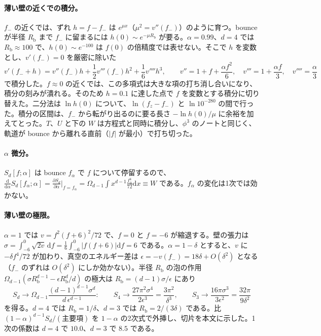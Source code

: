 \documentclass[a4paper,10pt]{ltjsarticle}
\newcommand{\dd}{\mathrm{d}}
\begin{document}
\paragraph{薄い壁の近くでの積分。}$f_-$ の近くでは、ずれ $h=f-f_-$ は $e^{\mu x}$（$\mu^2=v''(f_-)$）のように育つ。bounce が半径 $R_{\mathrm b}$ まで $f_-$ に留まるには $h(0)\sim e^{-\mu R_{\mathrm b}}$ が要る。$\alpha=0.99$、$d=4$ では $R_{\mathrm b}\approx100$ で、$h(0)\sim e^{-100}$ は $f(0)$ の倍精度では表せない。そこで $h$ を変数とし、$v'(f_-)=0$ を厳密に除いた
\begin{equation*}
v'(f_-+h)=v''(f_-)h+\frac12v'''(f_-)h^2+\frac16v''''h^3,\qquad v''=1+f+\frac{\alpha f^2}6,\quad v'''=1+\frac{\alpha f}3,\quad v''''=\frac\alpha3
\end{equation*}
で積分した。$f\approx0$ の近くでは、この多項式は大きな項の打ち消し合いになり、積分の刻みが潰れる。そのため $h=0.1$ に達した点で $f$ を変数とする積分に切り替えた。二分法は $\ln h(0)$ について、$\ln(f_z-f_-)$ と $\ln10^{-280}$ の間で行った。積分の区間は、$f_-$ から転がり出るのに要る長さ $-\ln h(0)/\mu$ に余裕を加えてとった。$T$、$U$ と下の $W$ は方程式と同時に積分し、$\phi^3$ のノートと同じく、軌道が bounce から離れる直前（$|f|$ が最小）で打ち切った。

\paragraph{$\alpha$ 微分。}$S_d[f;\alpha]$ は bounce $f_\alpha$ で $f$ について停留するので、$\frac{\dd}{\dd\alpha}S_d[f_\alpha;\alpha]=\frac{\partial S_d}{\partial\alpha}\big|_{f=f_\alpha}=\Omega_{d-1}\int x^{d-1}\frac{f_\alpha^4}{72}\dd x\equiv W$ である。$f_\alpha$ の変化は1次では効かない。

\paragraph{薄い壁の極限。}$\alpha=1$ では $v=f^2(f+6)^2/72$ で、$f=0$ と $f=-6$ が縮退する。壁の張力は $\sigma=\int_{-6}^0\sqrt{2v}\,\dd f=\frac16\int_{-6}^0|f(f+6)|\dd f=6$ である。$\alpha=1-\delta$ とすると、$v$ に $-\delta f^4/72$ が加わり、真空のエネルギー差は $\epsilon=-v(f_-)=18\delta+O(\delta^2)$ となる（$f_-$ のずれは $O(\delta^2)$ にしか効かない）。半径 $R_{\mathrm b}$ の泡の作用 $\Omega_{d-1}(\sigma R_{\mathrm b}^{d-1}-\epsilon R_{\mathrm b}^d/d)$ の極大は $R_{\mathrm b}=(d-1)\sigma/\epsilon$ にあり
\begin{equation*}
S_d\to\Omega_{d-1}\frac{(d-1)^{d-1}\sigma^d}{d\,\epsilon^{d-1}}:\qquad
S_4\to\frac{27\pi^2\sigma^4}{2\epsilon^3}=\frac{3\pi^2}{\delta^3},\qquad
S_3\to\frac{16\pi\sigma^3}{3\epsilon^2}=\frac{32\pi}{9\delta^2}
\end{equation*}
を得る。$d=4$ では $R_{\mathrm b}=1/\delta$、$d=3$ では $R_{\mathrm b}=2/(3\delta)$ である。比 $(1-\alpha)^{d-1}S_d/(\text{主要項})$ を $1-\alpha$ の2次式で外挿し、切片を本文に示した。1次の係数は $d=4$ で $10.0$、$d=3$ で $8.5$ である。
\end{document}
